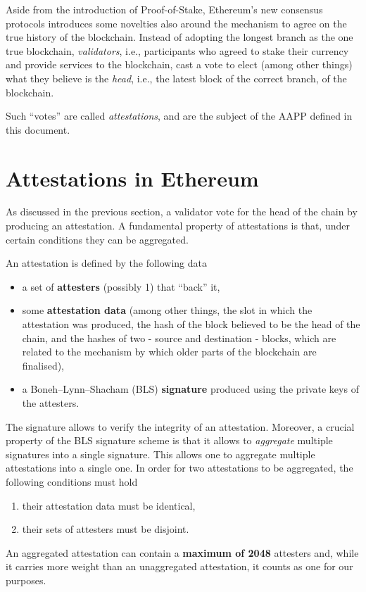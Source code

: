 \documentclass{article}
\begin{document}
Aside from the introduction of Proof-of-Stake, Ethereum's new consensus
protocols introduces some novelties also around the mechanism to agree on the
true history of the blockchain. Instead of adopting the longest branch as the
one true blockchain, \emph{validators}, i.e., participants who agreed to stake
their currency and provide services to the blockchain, cast a vote to elect
(among other things) what they believe is the \emph{head}, i.e., the latest
block of the correct branch, of the blockchain.

Such ``votes'' are called \emph{attestations}, and are the subject of the AAPP
defined in this document.

\section{Attestations in Ethereum}

As discussed in the previous section, a validator vote for the head of the 
chain by producing an attestation. A fundamental property of attestations is
that, under certain conditions they can be aggregated.

An attestation is defined by the following data
%
\begin{itemize}
  \item a set of \textbf{attesters} (possibly 1) that ``back'' it, 
  \item some \textbf{attestation data} (among other things, the slot in which
  the attestation was produced, the hash of the block believed to be the head
  of the chain, and the hashes of two - source and destination - blocks, which
  are related to the mechanism by which older parts of the blockchain are
  finalised), 
  \item a Boneh–Lynn–Shacham (BLS) \textbf{signature} produced using the
  private keys of the attesters.  
\end{itemize}
%
The signature allows to verify the integrity of an attestation. Moreover, a
crucial property of the BLS signature scheme is that it allows to
\emph{aggregate} multiple signatures into a single signature. This allows one
to aggregate multiple attestations into a single one. In order for two
attestations to be aggregated, the following conditions must hold
%
\begin{enumerate} 
  \item their attestation data must be identical, 
  \item their sets of attesters must be disjoint.
\end{enumerate}
%
An aggregated attestation can contain a \textbf{maximum of 2048} attesters
and, while it carries more weight than an unaggregated attestation, it counts
as one for our purposes.
\end{document}
